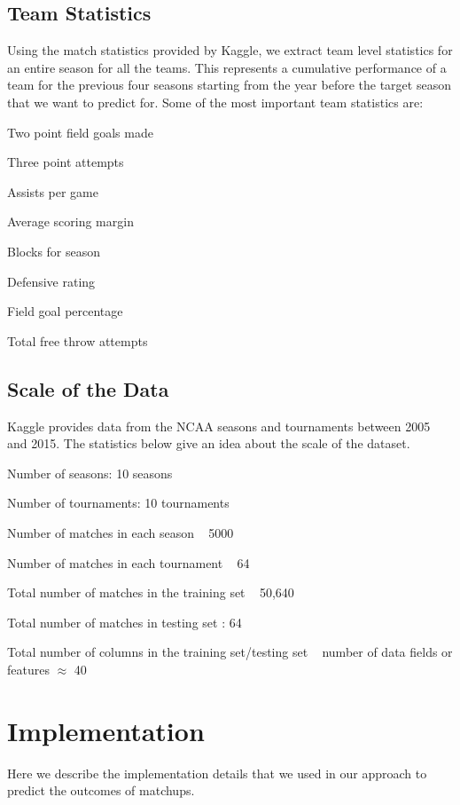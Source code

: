 \documentclass{article}
\begin{document}
    	\begin{multicols}{2} 
	
	\subsection{Team Statistics}
	Using the match statistics provided by Kaggle, we extract team level statistics for an entire season for all the teams. This represents a cumulative performance of a team for the previous four seasons starting from the year before the target season that we want to predict for. Some of the most important team statistics are:
	\begin{list}{•}
\item
	Two point field goals made 
\item
Three point attempts
\item
Assists per game
\item
Average scoring margin
\item
Blocks for season
\item
Defensive rating
\item
Field goal percentage
\item
Total free throw attempts
	\end{list}
	\subsection{Scale of the Data}
	Kaggle provides data from the NCAA seasons and tournaments between 2005 and 2015. The statistics below give an idea about the scale of the dataset.	
\begin{list}{•}
\item
Number of seasons: 10 seasons
\item
Number of tournaments: 10 tournaments
\item
Number of matches in each season ~ 5000
\item
Number of matches in each tournament ~ 64
\item
Total number of matches in the training set ~ 50,640
\item
Total number of matches in testing set : 64
\item
Total number of columns in the training set/testing set ~ number of data fields or features $\approx$ 40
\end{list}

	\section{Implementation}
	Here we describe the implementation details that we used in our approach to predict the outcomes of matchups.


\end{multicols}
\end{document}
